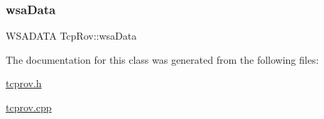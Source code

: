 \mbox{\label{class_tcp_rov_a922d1ddb18d544533c4579a04418fd9d}} 
\subsubsection{\texorpdfstring{wsa\+Data}{wsaData}}
{\footnotesize\ttfamily W\+S\+A\+D\+A\+TA Tcp\+Rov\+::wsa\+Data}



The documentation for this class was generated from the following files\+:\begin{DoxyCompactItemize}
\item 
\mbox{\hyperlink{tcprov_8h}{tcprov.\+h}}\item 
\mbox{\hyperlink{tcprov_8cpp}{tcprov.\+cpp}}\end{DoxyCompactItemize}
